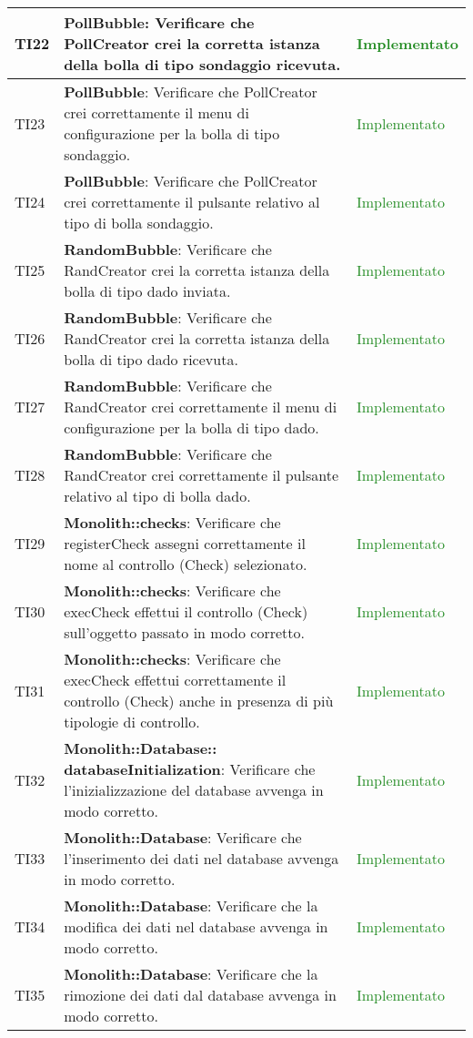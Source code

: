 \begin{center}
\begin{longtable}{|
*{1}{>{\centering\arraybackslash}p{1cm}|}
*{1}{>{\centering\arraybackslash}p{7cm}|}
*{1}{>{\centering\arraybackslash}p{3cm}|}}
 \hline 
TI22 & \textbf{PollBubble}: Verificare che PollCreator crei la corretta istanza della bolla di tipo sondaggio ricevuta. & \textcolor{ForestGreen}{Implementato}\\
 \hline 
TI23 & \textbf{PollBubble}: Verificare che PollCreator crei correttamente il menu di configurazione per la bolla di tipo sondaggio. & \textcolor{ForestGreen}{Implementato}\\
 \hline 
TI24 & \textbf{PollBubble}: Verificare che PollCreator crei correttamente il pulsante relativo al tipo di bolla sondaggio. & \textcolor{ForestGreen}{Implementato}\\
 \hline 
TI25 & \textbf{RandomBubble}: Verificare che RandCreator crei la corretta istanza della bolla di tipo dado inviata. & \textcolor{ForestGreen}{Implementato}\\
 \hline 
TI26 & \textbf{RandomBubble}: Verificare che RandCreator crei la corretta istanza della bolla di tipo dado ricevuta. & \textcolor{ForestGreen}{Implementato}\\
 \hline 
TI27 & \textbf{RandomBubble}: Verificare che RandCreator crei correttamente il menu di configurazione per la bolla di tipo dado. & \textcolor{ForestGreen}{Implementato}\\
 \hline 
TI28 & \textbf{RandomBubble}: Verificare che RandCreator crei correttamente il pulsante relativo al tipo di bolla dado. & \textcolor{ForestGreen}{Implementato}\\
 \hline 
TI29 & \textbf{Monolith::checks}: Verificare che registerCheck assegni correttamente il nome al controllo (Check) selezionato. & \textcolor{ForestGreen}{Implementato}\\
 \hline 
TI30 & \textbf{Monolith::checks}: Verificare che execCheck effettui il controllo (Check) sull'oggetto passato in modo corretto. & \textcolor{ForestGreen}{Implementato}\\
 \hline 
TI31 & \textbf{Monolith::checks}: Verificare che execCheck effettui correttamente il controllo (Check) anche in presenza di più tipologie di controllo. & \textcolor{ForestGreen}{Implementato}\\
 \hline 
TI32 & \textbf{Monolith::Database:: databaseInitialization}: Verificare che l'inizializzazione del database avvenga in modo corretto. & \textcolor{ForestGreen}{Implementato}\\
 \hline 
TI33 & \textbf{Monolith::Database}: Verificare che l'inserimento dei dati nel database avvenga in modo corretto. & \textcolor{ForestGreen}{Implementato}\\
 \hline 
TI34 & \textbf{Monolith::Database}: Verificare che la modifica dei dati nel database avvenga in modo corretto. & \textcolor{ForestGreen}{Implementato}\\
 \hline 
TI35 & \textbf{Monolith::Database}: Verificare che la rimozione dei dati dal database avvenga in modo corretto. & \textcolor{ForestGreen}{Implementato}\\
 \hline 
\end{longtable}
\end{center}